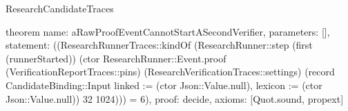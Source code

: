 \begin{lexlean}{ResearchCandidateTraces}
\begin{semanticmodule}
theorem{
 name: aRawProofEventCannotStartASecondVerifier,
 parameters: [],
 statement: ((ResearchRunnerTraces::kindOf (ResearchRunner::step (first (runnerStarted)) (ctor ResearchRunner::Event.proof (VerificationReportTraces::pins) (ResearchVerificationTraces::settings) (record CandidateBinding::Input {linked := (ctor Json::Value.null), lexicon := (ctor Json::Value.null)}) 32 1024))) = 6),
 proof: decide{},
 axioms: [Quot.sound, propext]
}
\end{semanticmodule}
\end{lexlean}
